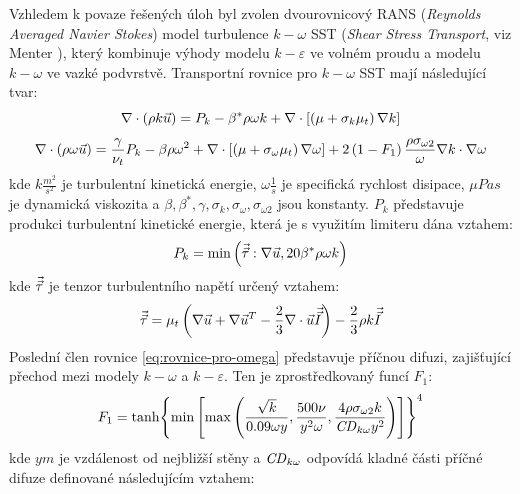         Vzhledem k povaze řešených úloh byl zvolen dvourovnicový RANS (\textit{Reynolds Averaged Navier Stokes}) model turbulence $k-\omega$ SST (\textit{Shear Stress Transport}, viz Menter \cite{Menter1993,Menter1994}), který kombinuje výhody modelu $k-\varepsilon$ ve volném proudu a modelu $k-\omega$ ve vazké podvrstvě. Transportní rovnice pro $k-\omega$ SST mají následující tvar:
        \begin{equation} \label{eq:rovnice-pro-k} 
            \nabla \cdot \left( \rho k \Vec{u} \right) = P_k - \beta ^* \rho \omega k + \nabla \cdot \left[ \left( \mu + \sigma _k \mu _t \right) \nabla k \right]
        \end{equation}
        \begin{equation} \label{eq:rovnice-pro-omega}
            \nabla \cdot \left( \rho \omega \Vec{u} \right) = \frac{\gamma}{\nu _t} P_k - \beta \rho \omega ^2 + \nabla \cdot \left[ \left( \mu + \sigma _\omega \mu _t \right) \nabla \omega \right] + 2 \left( 1 - F_1 \right) \frac{\rho \sigma _{\omega 2}}{\omega} \nabla k \cdot \nabla \omega
        \end{equation}
        \noindent kde $k \unit{\frac{m^2}{s^2}}$ je turbulentní kinetická energie, $\omega \unit{\frac{1}{s}}$ je specifická rychlost disipace, $\mu \unit{Pa s}$ je dynamická viskozita a $\beta, \beta^*, \gamma, \sigma _k, \sigma _\omega, \sigma _{\omega 2}$ jsou konstanty. $P_k$ představuje produkci turbulentní kinetické energie, která je s využitím limiteru dána vztahem:
        \begin{equation}
            P_k = \min \left( \Vec{\Vec{\tau}} : \nabla \Vec{u}, 20 \beta ^* \rho \omega k \right)
        \end{equation}
        kde $\Vec{\Vec{\tau}}$ je tenzor turbulentního napětí určený vztahem:
        \begin{equation}
            \Vec{\Vec{\tau}} = \mu _t \left( \nabla \Vec{u} + \nabla \Vec{u} ^T - \frac{2}{3} \nabla \cdot \Vec{u} \Vec{\Vec{I}} \right) - \frac{2}{3} \rho k \Vec{\Vec{I}}
        \end{equation}
        Poslední člen rovnice \ref{eq:rovnice-pro-omega} představuje příčnou difuzi, zajišťující přechod mezi modely $k-\omega$ a $k-\varepsilon$. Ten je zprostředkovaný funcí $F_1$:
        \begin{equation}
            F_1 = \tanh \Biggl\{ \min \left[  \max \left( \frac{\sqrt{k}}{0.09 \omega y}, \frac{500 \nu}{y^2 \omega}, \frac{4 \rho \sigma _{\omega 2} k}{\mathord{\mathit{CD}}_{k \omega} y^2} \right) \right] \Biggr\} ^4  
        \end{equation}
        \noindent kde $y \unit{m}$ je vzdálenost od nejbližší stěny a $\mathord{\mathit{CD}}_{k \omega}$ odpovídá kladné části příčné difuze definované následujícím vztahem:
